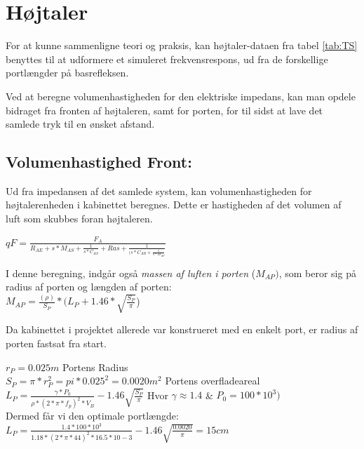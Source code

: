 \section{Højtaler}

For at kunne sammenligne teori og praksis, kan højtaler-dataen fra tabel \ref{tab:TS} benyttes til at udformere et simuleret frekvensrespons, ud fra de forskellige portlængder på basrefleksen. 

Ved at beregne volumenhastigheden for den elektriske impedans, kan man opdele bidraget fra fronten af højtaleren, samt for porten, for til sidst at lave det samlede tryk til en ønsket afstand. 


\subsection{Volumenhastighed Front:}
\label{sec:sim_calc}

Ud fra impedansen af det samlede system, kan volumenhastigheden for højtalerenheden i kabinettet beregnes. Dette er hastigheden af det volumen af luft som skubbes foran højtaleren. 

{\Large\(qF=\)}{\huge \(\frac{F_A}{R_{AE}+s*M_{AS}+\frac{1}{s*C_{AS}}+Ras+\frac{1}{(s*C_{AB}+\frac{1}{s*M_{AP}}}}\) }

I denne beregning, indgår også \textit{massen af luften i porten} ($M_{AP})$, som beror sig på radius af porten og længden af porten:\\

\(M_{AP}=\frac{(\rho)}{S_P}*(L_P+1.46*\sqrt{\frac{S_P}{\pi}}\))

Da kabinettet i projektet allerede var konstrueret med en enkelt port, er radius af porten fastsat fra start.

\(r_P=0.025 m\)		\hspace{6.2cm} Portens Radius\\
\(S_P=\pi*r_P^2=pi*0.025^2=0.0020 m^2\)		\hspace{2cm} Portens overfladeareal\\

\(L_P=\frac{\gamma*P_0}{\rho*(2*\pi*f_p)^2*V_{B}}-1.46\sqrt{\frac{S_P}{\pi}}\)			\hspace{3cm} Hvor $\gamma \approx 1.4$ \& $P_0=100*10^3)$\\

Dermed får vi den optimale portlængde:\\

\(L_P=\frac{1.4*100*10^3}{1.18*(2*\pi*44)^2*16.5*10-3}-1.46\sqrt{\frac{0.0020}{\pi}}=15cm\)


